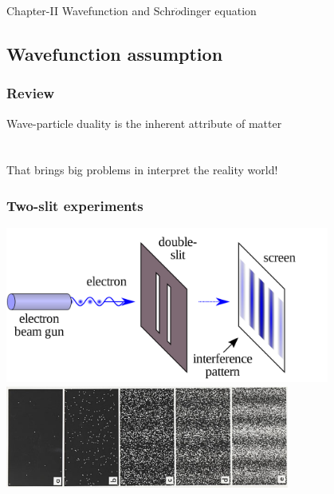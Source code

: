 \begin{frame}
    \frametitle{}
    \begin{center}
    { {\huge Chapter-II Wavefunction and Schr$\ddot{o}$dinger equation }}
    \end{center}    
\end{frame}

\subsection{Wavefunction assumption}

\begin{frame}
    \frametitle{Review}
    \begin{center}
        Wave-particle duality is the inherent attribute of matter \\
        ~~\\
        ~~\\
        That brings big problems in interpret the reality world! \\
    \end{center} 
\end{frame}

\begin{frame}
    \frametitle{Two-slit experiments}
    \begin{center}
        \includegraphics[width=0.8\textwidth]{figs/Etwoslitexp.png} \\
        \includegraphics[width=0.7\textwidth]{figs/two-slit.png} \\
    \end{center} 
\end{frame}

